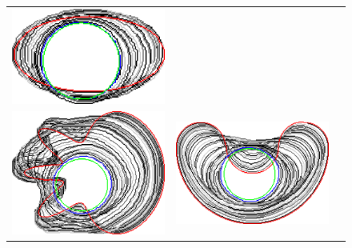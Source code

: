 \begin{figure}[]
\begin{tabular}{ccc}
\includegraphics[scale=0.25]{figures/chapter5/flow/ellipse/radius_5/ii/selastica/len_pen_0.01000/jonctions_1/curve_segs_4/best/gs_0.25000/summary.pdf}\\[2em]
\includegraphics[scale=0.25]{figures/chapter5/flow/flower/radius_5/ii/selastica/len_pen_0.01000/jonctions_1/curve_segs_4/best/gs_0.25000/summary.pdf} &
\includegraphics[scale=0.25]{figures/chapter5/flow/bean/radius_5/ii/selastica/len_pen_0.01000/jonctions_1/curve_segs_4/best/gs_0.25000/summary.pdf} &

\end{tabular}
\end{figure}
